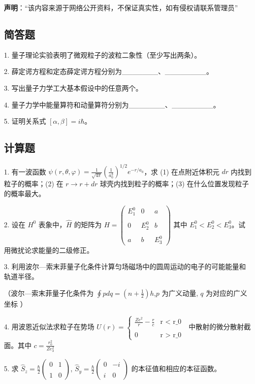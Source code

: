 
\textbf{声明}：“该内容来源于网络公开资料，不保证真实性，如有侵权请联系管理员”

\subsection{简答题}

1. 量子理论实验表明了微观粒子的波粒二象性（至少写出两条）。

2. 薛定谔方程和定态薛定谔方程分别为_______、________。

3. 写出量子力学工大基本假设中的任意两个。

4. 量子力学中能量算符和动量算符分别为_______、________。

5. 证明关系式 $[\alpha, \beta] = i \hbar$。

\subsection{计算题}

1. 有一波函数 $\psi(r, \theta, \varphi) = \frac{1}{\sqrt{4 \pi}} \left( \frac{1}{a_0^3} \right)^{1/2} e^{-r/a_0}$，求 (1) 在点附近体积元 $dr$ 内找到粒子的概率；(2) 在 $r \to r + dr$ 球壳内找到粒子的概率；(3) 在什么位置发现粒子的概率最大。

2. 设在 $H^0$ 表象中，$\hat{H}$ 的矩阵为
$\hat{H} = \begin{pmatrix}E_1^0 & 0 & a \\\\0 & E_2^0 & b \\\\a & b & E_3^0\end{pmatrix}$
其中 $E_1^0 < E_2^0 < E_3^0$。试用微扰论求能量的二级修正。

3. 利用波尔—索末菲量子化条件计算匀场磁场中的圆周运动的电子的可能能量和轨道半径。

（波尔—索末菲量子化条件为 $\oint p dq = (n + \frac{1}{2}) h$,$p$ 为广义动量, $q$ 为对应的广义坐标 ）

4. 用波恩近似法求粒子在势场 $U(r) = \begin{cases} 
\frac{Ze^2}{r} - \frac{r}{c} & \text {r < r_0 }\\\\
0 & \text{r > r_0 }
\end{cases}$ 中散射的微分散射截面。其中
$c = \frac{r_0^2}{Ze_3^2}$

5. 求 $\hat{S}_z = \frac{\hbar}{2} \begin{pmatrix}
0 & 1 \\\\
1 & 0
\end{pmatrix}$, $\hat{S}_y = \frac{\hbar}{2} \begin{pmatrix}
0 & -i \\\\
i & 0
\end{pmatrix}$ 的本征值和相应的本征函数。

